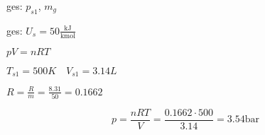 

\item[a)] ges: $p_{s1}$, $m_{g}$
    
    ges: $U_{s} = 50 \frac{\text{kJ}}{\text{kmol}}$
    
    $pV = nRT$
    
    $T_{s1} = 500K \quad V_{s1} = 3.14L$
    
    $R = \frac{R}{m} = \frac{8.31}{50} = 0.1662$
    
    \[
    p = \frac{nRT}{V} = \frac{0.1662 \cdot 500}{3.14} = 3.54 \text{bar}
    \]